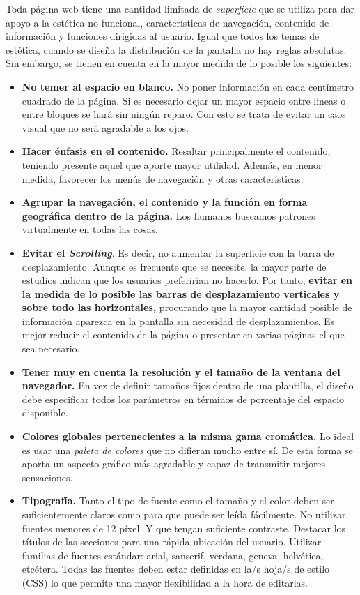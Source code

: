 \documentclass[a4paper,oneside,11pt]{book}
\begin{document}
		Toda página web tiene una cantidad limitada de \textit{superficie} que se utiliza para dar apoyo a la estética no funcional, características de navegación, contenido de información y funciones dirigidas al usuario. Igual que todos los temas de estética, cuando se diseña la distribución de la pantalla no hay reglas absolutas. Sin embargo, se tienen en cuenta en la mayor medida de lo posible los siguientes:
		\begin{itemize}
			\item \textbf{No temer al espacio en blanco.} No poner información en cada centímetro cuadrado de la página. Si es necesario dejar un mayor espacio entre líneas o entre bloques se hará sin ningún reparo. Con esto se trata de evitar un caos visual que no será agradable a los ojos.	
			\item \textbf{Hacer énfasis en el contenido.} Resaltar principalmente el contenido, teniendo presente aquel que aporte mayor utilidad. Además, en menor medida, favorecer los menús de navegación y otras características.
			\item \textbf{Agrupar la navegación, el contenido y la función en forma geográfica dentro de la página.} Los humanos buscamos patrones virtualmente en todas las cosas.
			\item \textbf{Evitar el \textit{Scrolling}}. Es decir, no aumentar la superficie con la barra de desplazamiento. Aunque es frecuente que se necesite, la mayor parte de estudios indican que los usuarios preferirían no hacerlo. Por tanto, \textbf{evitar en la medida de lo posible las barras de desplazamiento verticales y sobre todo las horizontales,} procurando que la mayor cantidad posible de información aparezca en la pantalla sin necesidad de desplazamientos. Es mejor reducir el contenido de la página o presentar en varias páginas el que sea necesario.
			\item \textbf{Tener muy en cuenta la resolución y el tamaño de la ventana del navegador.} En vez de definir tamaños fijos dentro de una plantilla, el diseño debe especificar todos los parámetros en términos de porcentaje del espacio disponible.
			\item \textbf{Colores globales pertenecientes a la misma gama cromática.} Lo ideal es usar una \textit{paleta de colores} que no difieran mucho entre sí. De esta forma se aporta un aspecto gráfico más agradable y capaz de transmitir mejores sensaciones.
			\item \textbf{Tipografía.} Tanto el tipo de fuente como el tamaño y el color deben ser suficientemente claros como para que puede ser leída fácilmente. No utilizar fuentes menores de 12 píxel. Y que tengan suficiente contraste. Destacar los títulos de las secciones para una rápida ubicación del usuario. Utilizar familias de fuentes estándar: arial, sanserif, verdana, geneva, helvética, etcétera. Todas las fuentes deben estar definidas en la/s hoja/s de estilo (CSS) lo que permite una mayor flexibilidad a la hora de editarlas.

\end{itemize}
\end{document}
